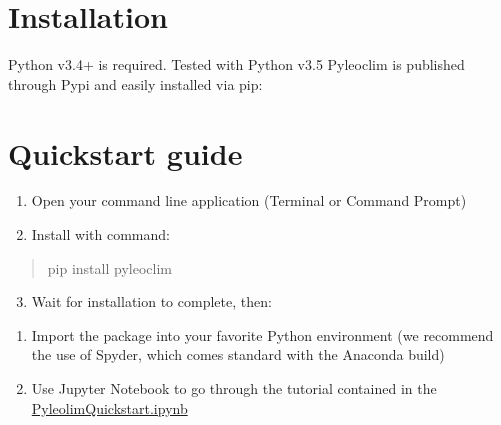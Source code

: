 \documentclass[letterpaper,10pt,english]{sphinxmanual}
\begin{document}
\section{Installation}
\label{\detokenize{Introduction:installation}}
Python v3.4+ is required. Tested with Python v3.5
Pyleoclim is published through Pypi and easily installed via pip:

\begin{sphinxVerbatim}[commandchars=\\\{\}]
  
\end{sphinxVerbatim}


\section{Quickstart guide}
\label{\detokenize{Introduction:quickstart-guide}}\begin{enumerate}
\item {} 
Open your command line application (Terminal or Command Prompt)

\item {} 
Install with command:

\end{enumerate}
\begin{quote}

pip install pyleoclim
\end{quote}
\begin{enumerate}
\setcounter{enumi}{2}
\item {} 
Wait for installation to complete, then:

\end{enumerate}
\begin{enumerate}
\item {} 
Import the package into your favorite Python environment (we recommend the use of Spyder, which comes standard with the Anaconda build)

\item {} 
Use Jupyter Notebook to go through the tutorial contained in the \href{https://github.com/LinkedEarth/Pyleoclim\_util/tree/master/Example}{PyleolimQuickstart.ipynb}

\end{enumerate}
\end{document}
